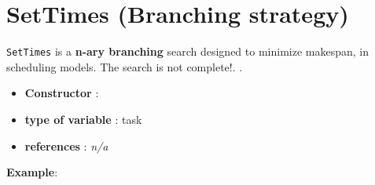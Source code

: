 \section{SetTimes (Branching strategy)}\label{settimes:settimesbranchstrat}\hypertarget{settimes:settimesbranchstrat}{}
\begin{notedef}
  \texttt{SetTimes} is a \textbf{n-ary branching} search designed to minimize makespan, in scheduling models. The search is not complete!. .
  \end{notedef}

\begin{itemize}
	\item \textbf{Constructor} :
	\item \textbf{type of variable} : task
	\item \textbf{references} : \emph{n/a}
\end{itemize}

\textbf{Example}:
%

